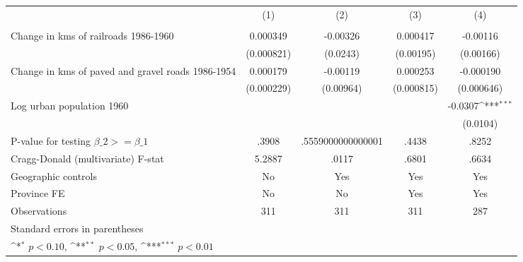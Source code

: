 {
\def\sym#1{\ifmmode^{#1}\else\(^{#1}\)\fi}
\begin{tabular}{l*{4}{c}}
\hline\hline
                &\multicolumn{1}{c}{(1)}&\multicolumn{1}{c}{(2)}&\multicolumn{1}{c}{(3)}&\multicolumn{1}{c}{(4)}\\
                &\multicolumn{1}{c}{}&\multicolumn{1}{c}{}&\multicolumn{1}{c}{}&\multicolumn{1}{c}{}\\
\hline
Change in kms of railroads 1986-1960& 0.000349         & -0.00326         & 0.000417         & -0.00116         \\
                &(0.000821)         & (0.0243)         &(0.00195)         &(0.00166)         \\
[1em]
Change in kms of paved and gravel roads 1986-1954& 0.000179         & -0.00119         & 0.000253         &-0.000190         \\
                &(0.000229)         &(0.00964)         &(0.000815)         &(0.000646)         \\
[1em]
Log urban population 1960&                  &                  &                  &  -0.0307\sym{***}\\
                &                  &                  &                  & (0.0104)         \\
\hline
P-value for testing $\beta\_{2} >= \beta\_{1}$&    .3908         &.5559000000000001         &    .4438         &    .8252         \\
Cragg-Donald (multivariate) F-stat&   5.2887         &    .0117         &    .6801         &    .6634         \\
Geographic controls&       No         &      Yes         &      Yes         &      Yes         \\
Province FE     &       No         &       No         &      Yes         &      Yes         \\
Observations    &      311         &      311         &      311         &      287         \\
\hline\hline
\multicolumn{5}{l}{\footnotesize Standard errors in parentheses}\\
\multicolumn{5}{l}{\footnotesize \sym{*} \(p<0.10\), \sym{**} \(p<0.05\), \sym{***} \(p<0.01\)}\\
\end{tabular}
}
